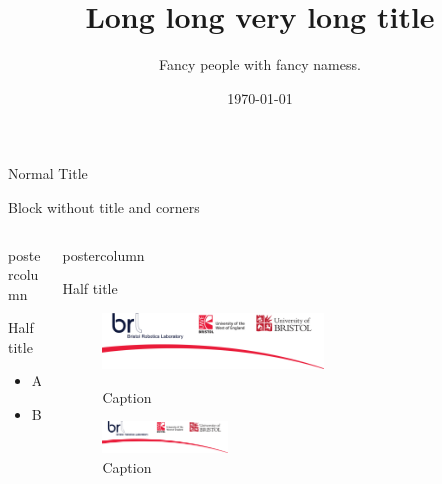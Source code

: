 \documentclass{beamer}
\title{Long long very long title}
\author{Fancy people with fancy namess.}
\institute{Fancy institutions with fancy names.}
\date{\today}
\begin{document}
\begin{frame}
	
\begin{BRLblock}{Normal Title}
\blindmathtrue \blindtext
\end{BRLblock}

\vspace{0.8cm}
\begin{BRLblock}[colframe=white,no shadow]{}
	Block without title and corners
\end{BRLblock}	
\vspace{3.0cm}

\begin{columns}[t]
	\begin{column}{.49\textwidth}
		\begin{beamercolorbox}[center,wd=\textwidth]{postercolumn}
			\begin{BRLblock}[equal height group=A]{Half title}
				\blindtext
				\begin{itemize}
					\item A
					\item B
				\end{itemize}
			\end{BRLblock}\vfill
	\end{beamercolorbox}
	\end{column}
	\hspace{15pt}
	\begin{column}{.49\textwidth}
		\begin{beamercolorbox}[center,wd=\textwidth]{postercolumn}
			\begin{BRLblock}[equal height group=A]{Half title}
				\blindtext
				\begin{figure}
					\begin{minipage}{0.43\textwidth}
						\centering\includegraphics[width=0.6\textwidth]{BRL}
						\caption{Caption}
					\end{minipage}
					\begin{minipage}{0.03\textwidth}
					\end{minipage}
					\begin{minipage}{0.45\textwidth}
						\centering\includegraphics[width=0.34\textwidth]{BRL}
						\caption{Caption}
					\end{minipage}
				\end{figure}
			\end{BRLblock}
		\end{beamercolorbox}
	\end{column}
\end{columns}


\end{frame}
\end{document}
